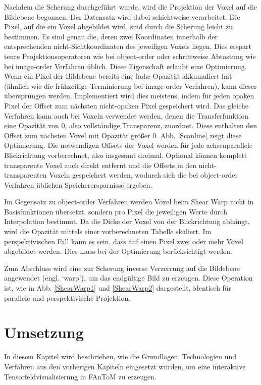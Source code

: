 \documentclass[a4paper,fontsize=12pt,toc=bib,halfparskip]{scrartcl}
\begin{document}
Nachdem die Scherung durchgef\"uhrt wurde, wird die Projektion der Voxel auf die Bildebene begonnen. Der Datensatz wird dabei schichtweise verarbeitet. Die Pixel, auf die ein Voxel abgebildet wird, sind durch die Scherung leicht zu bestimmen. Es sind genau die, deren zwei Koordinaten innerhalb der entsprechenden nicht-Sichtkoordinaten des jeweiligen Voxels liegen. Dies erspart teure Projektionsoperatoren wie bei object-order oder schrittweise Abtastung wie bei image-order Verfahren \"ublich. Diese Eigenschaft erlaubt eine Optimierung. Wenn ein Pixel der Bildebene bereits eine hohe Opazit\"at akkumuliert hat (\"ahnlich wie die fr\"uhzeitige Terminierung bei image-order Verfahren), kann dieser \"ubersprungen werden. Implementiert wird dies meistens, indem f\"ur jeden opaken Pixel der Offset zum n\"achsten nicht-opaken Pixel gespeichert wird. Das gleiche Verfahren kann auch bei Voxeln verwendet werden, denen die Transferfunktion eine Opazit\"at von 0, also vollst\"andige Transparenz, zuordnet. Diese enthalten den Offset zum n\"achsten Voxel mit Opazit\"at gr\"o{\ss}er 0. Abb. \ref{Scanline} zeigt diese Optimierung. Die notwendigen Offsets der Voxel werden f\"ur jede achsenparallele Blickrichtung vorberechnet, also insgesamt dreimal. Optional k\"onnen komplett transparente Voxel auch direkt entfernt und die Offsets in den nicht-transparenten Voxeln gespeichert werden, wodurch sich die bei object-order Verfahren \"ublichen Speicherersparnisse ergeben. 

Im Gegensatz zu object-order Verfahren werden Voxel beim Shear Warp nicht in Basisfunktionen \"ubersetzt, sondern pro Pixel die jeweiligen Werte durch Interpolation bestimmt. Da die Dicke der Voxel von der Blickrichtung abh\"angt, wird die Opazit\"at mittels einer vorberechneten Tabelle skaliert. Im perspektivischen Fall kann es sein, dass auf einen Pixel zwei oder mehr Voxel abgebildet werden. Dies muss bei der Optimierung ber\"ucksichtigt werden.

Zum Abschluss wird eine zur Scherung inverse Verzerrung auf die Bildebene angewendet (engl. `warp'), um das endg\"ultige Bild zu erzeugen. Diese Operation ist, wie in Abb. \ref{ShearWarp1} und \ref{ShearWarp2} dargestellt, identisch f\"ur parallele und perspektivische Projektion.



\section{Umsetzung}
\label{sec:Umsetzung}
In diesem Kapitel wird beschrieben, wie die Grundlagen, Technologien und Verfahren aus den vorherigen Kapiteln eingesetzt wurden, um eine interaktive Tensorfeldvisualisierung in FAnToM zu erzeugen.
\end{document}
